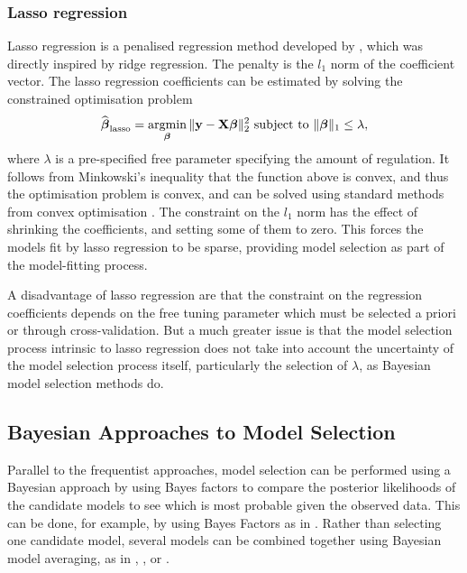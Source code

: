 
\subsubsection{Lasso regression}
Lasso regression is a penalised regression method developed by \citep{Tibshirani1996}, which was directly
inspired by ridge regression. 
The penalty is the $l_1$ norm of the coefficient vector.
The lasso regression coefficients can be estimated by solving the constrained optimisation problem
$$
\widehat{\vbeta}_{\text{lasso}} = \argmin_\vbeta \|\vy - \mX \vbeta\|_2^2 \text{ subject to } \|\vbeta\|_1 \leq \lambda,
$$
where $\lambda$ is a pre-specified free parameter specifying the amount of regulation.  It follows from
Minkowski's inequality that the function above is convex, and thus the optimisation problem is convex, and can
be solved using standard methods from convex optimisation \citep{Boyd2010}.  The constraint on the $l_1$ norm
has the effect of shrinking the coefficients, and setting some of them to zero. This forces the models fit by
lasso regression to be sparse, providing model selection as part of the model-fitting process.

A disadvantage of lasso regression are that the constraint on the regression coefficients depends on the free
tuning parameter which must be selected a priori or through cross-validation. But a much greater issue is that
the model selection process intrinsic to lasso regression does not take into account the uncertainty of the
model selection process itself, particularly the selection of $\lambda$, as Bayesian model selection methods do.

\subsection{Bayesian Approaches to Model Selection}
Parallel to the frequentist approaches, model selection can be performed using a Bayesian approach by using
Bayes factors to compare the posterior likelihoods of the candidate models to see which is most probable given
the observed data. This can be done, for example, by using Bayes Factors as in \citep{Kass1993}. Rather than
selecting one candidate model, several models can be combined together using Bayesian model  averaging, as in
\citep{Hoeting1999}, \citep{Raftery1997}, \citep{Fernandez2001} or \citep{Papaspiliopoulos2016}.

